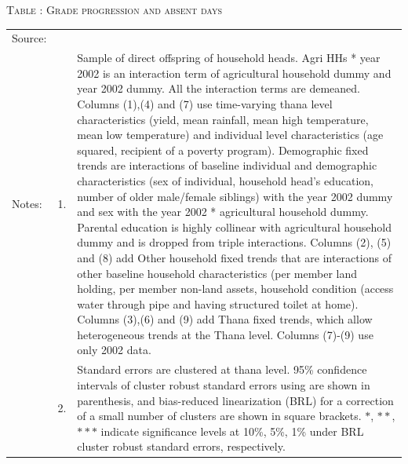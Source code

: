 \documentclass[12pt,letterpaper]{article}
\newcommand{\0}{\ensuremath{\mbox{\boldmath $0$}}}
\begin{document}
\begin{table}
\hfil\textsc{\footnotesize Table \thetable: Grade progression and absent days\label{NumGradesDaysAbsentResults}}\\
\setlength{\tabcolsep}{1pt}
\renewcommand{\arraystretch}{.75}
\hfil
\renewcommand{\arraystretch}{1}
\hfil\begin{tabular}{>{\hfill\scriptsize}p{1cm}<{}>{\hfill\scriptsize}p{.25cm}<{}>{\scriptsize}p{.7\paperwidth}<{\hfill}}
Source:& \multicolumn{2}{l}{\scriptsize Compiled from IFPRI data. }\\[-1ex]
Notes:& 1. & Sample of direct offspring of household heads. \textsf{Agri HHs * year 2002} is an interaction term of agricultural household dummy and year 2002 dummy. All the interaction terms are demeaned. Columns \textsf{(1),(4) and (7)} use time-varying thana level characteristics (yield, mean rainfall, mean high temperature, mean low temperature) and individual level characteristics (age squared, recipient of a poverty program). \textsf{Demographic fixed trends} are interactions of baseline individual and demographic characteristics (sex of individual, household head's education, number of older male/female siblings) with the year 2002 dummy and sex with the year 2002 * agricultural household dummy. Parental education is highly collinear with agricultural household dummy and is dropped from triple interactions. Columns \textsf{(2), (5) and (8)} add \textsf{Other household fixed trends} that are interactions of other baseline household characteristics (per member land holding, per member non-land assets, household condition (access water through pipe and having structured toilet at home). Columns \textsf{(3),(6) and (9)} add \textsf{Thana fixed trends}, which allow heterogeneous trends at the Thana level. Columns (7)-(9) use only 2002 data.\\[-1ex]
& 2. & Standard errors are clustered at thana level. 95\% confidence intervals of cluster robust standard errors using \cite{liang1986longitudinal} are shown in parenthesis, and bias-reduced linearization (BRL) for a correction of a small number of clusters are shown in square brackets. $*$, $**$, $***$ indicate significance levels at 10\%, 5\%, 1\% under BRL cluster robust standard errors, respectively.
\end{tabular}
\end{table}
\end{document}
